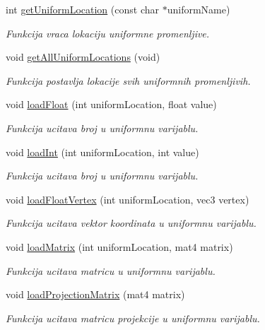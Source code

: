\begin{DoxyCompactItemize}
int \hyperlink{classshader_1_1SkyboxShader_a4a253cd426b56b9a7cd2e232dfc34ef6}{get\+Uniform\+Location} (const char $\ast$uniform\+Name)
\begin{DoxyCompactList}\small\item\em Funkcija vraca lokaciju uniformne promenljive. \end{DoxyCompactList}\item 
void \hyperlink{classshader_1_1SkyboxShader_a1add7258c2e59462e6214d904a5a4256}{get\+All\+Uniform\+Locations} (void)
\begin{DoxyCompactList}\small\item\em Funkcija postavlja lokacije svih uniformnih promenljivih. \end{DoxyCompactList}\item 
void \hyperlink{classshader_1_1SkyboxShader_a76e48c257263e1434e465539824c6670}{load\+Float} (int uniform\+Location, float value)
\begin{DoxyCompactList}\small\item\em Funkcija ucitava broj u uniformnu varijablu. \end{DoxyCompactList}\item 
void \hyperlink{classshader_1_1SkyboxShader_a1d7818f1d41d2dbec52f33e49fead0ec}{load\+Int} (int uniform\+Location, int value)
\begin{DoxyCompactList}\small\item\em Funkcija ucitava broj u uniformnu varijablu. \end{DoxyCompactList}\item 
void \hyperlink{classshader_1_1SkyboxShader_ad1fe04f2b333178df6d760727ec8193d}{load\+Float\+Vertex} (int uniform\+Location, vec3 vertex)
\begin{DoxyCompactList}\small\item\em Funkcija ucitava vektor koordinata u uniformnu varijablu. \end{DoxyCompactList}\item 
void \hyperlink{classshader_1_1SkyboxShader_aa393967943968af99c1eab26f510f856}{load\+Matrix} (int uniform\+Location, mat4 matrix)
\begin{DoxyCompactList}\small\item\em Funkcija ucitava matricu u uniformnu varijablu. \end{DoxyCompactList}\item 
void \hyperlink{classshader_1_1SkyboxShader_a6535b40978fc4a7bbe2b26b20f4b55c4}{load\+Projection\+Matrix} (mat4 matrix)
\begin{DoxyCompactList}\small\item\em Funkcija ucitava matricu projekcije u uniformnu varijablu. \end{DoxyCompactList}\item 

\end{DoxyCompactItemize}
